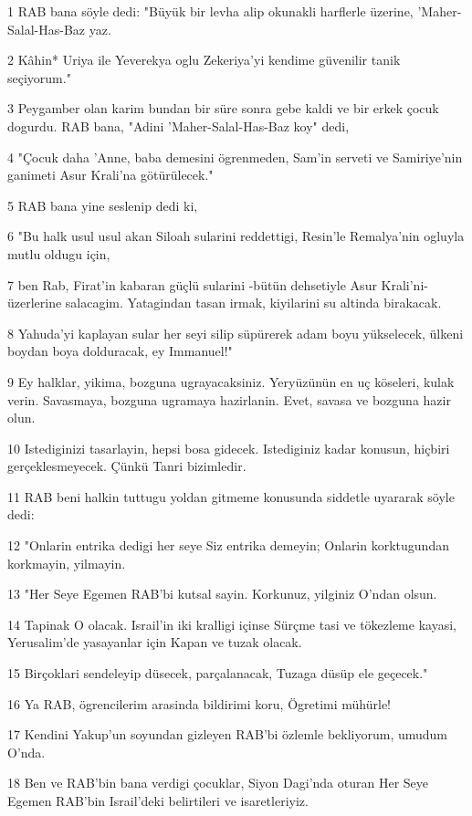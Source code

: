 \par 1 RAB bana söyle dedi: "Büyük bir levha alip okunakli harflerle üzerine, 'Maher-Salal-Has-Baz yaz.
\par 2 Kâhin* Uriya ile Yeverekya oglu Zekeriya'yi kendime güvenilir tanik seçiyorum."
\par 3 Peygamber olan karim bundan bir süre sonra gebe kaldi ve bir erkek çocuk dogurdu. RAB bana, "Adini 'Maher-Salal-Has-Baz koy" dedi,
\par 4 "Çocuk daha 'Anne, baba demesini ögrenmeden, Sam'in serveti ve Samiriye'nin ganimeti Asur Krali'na götürülecek."
\par 5 RAB bana yine seslenip dedi ki,
\par 6 "Bu halk usul usul akan Siloah sularini reddettigi, Resin'le Remalya'nin ogluyla mutlu oldugu için,
\par 7 ben Rab, Firat'in kabaran güçlü sularini -bütün dehsetiyle Asur Krali'ni- üzerlerine salacagim. Yatagindan tasan irmak, kiyilarini su altinda birakacak.
\par 8 Yahuda'yi kaplayan sular her seyi silip süpürerek adam boyu yükselecek, ülkeni boydan boya dolduracak, ey Immanuel!"
\par 9 Ey halklar, yikima, bozguna ugrayacaksiniz. Yeryüzünün en uç köseleri, kulak verin. Savasmaya, bozguna ugramaya hazirlanin. Evet, savasa ve bozguna hazir olun.
\par 10 Istediginizi tasarlayin, hepsi bosa gidecek. Istediginiz kadar konusun, hiçbiri gerçeklesmeyecek. Çünkü Tanri bizimledir.
\par 11 RAB beni halkin tuttugu yoldan gitmeme konusunda siddetle uyararak söyle dedi:
\par 12 "Onlarin entrika dedigi her seye Siz entrika demeyin; Onlarin korktugundan korkmayin, yilmayin.
\par 13 "Her Seye Egemen RAB'bi kutsal sayin. Korkunuz, yilginiz O'ndan olsun.
\par 14 Tapinak O olacak. Israil'in iki kralligi içinse Sürçme tasi ve tökezleme kayasi, Yerusalim'de yasayanlar için Kapan ve tuzak olacak.
\par 15 Birçoklari sendeleyip düsecek, parçalanacak, Tuzaga düsüp ele geçecek."
\par 16 Ya RAB, ögrencilerim arasinda bildirimi koru, Ögretimi mühürle!
\par 17 Kendini Yakup'un soyundan gizleyen RAB'bi özlemle bekliyorum, umudum O'nda.
\par 18 Ben ve RAB'bin bana verdigi çocuklar, Siyon Dagi'nda oturan Her Seye Egemen RAB'bin Israil'deki belirtileri ve isaretleriyiz.
